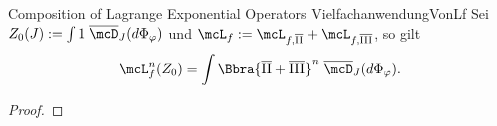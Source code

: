 \begin{mcor}{Composition of Lagrange Exponential Operators}
    {VielfachanwendungVonLf}
    Sei $Z_0(J) := \int 1\;\overline\mcD_J(d\Phi_\varphi)$ und $\mcL_f:=\mcL_{f,\overline{\text{II}}} + \mcL_{f,\overline{\text{III}}}$, so gilt
    \[
        \mcL_f^n(Z_0) = \int \Bbra{\overline{\text{II}} + \overline{\text{III}}}^n\;\overline\mcD_J(d\Phi_\varphi).
    \]
\end{mcor}
\begin{proof}
    
\end{proof}
